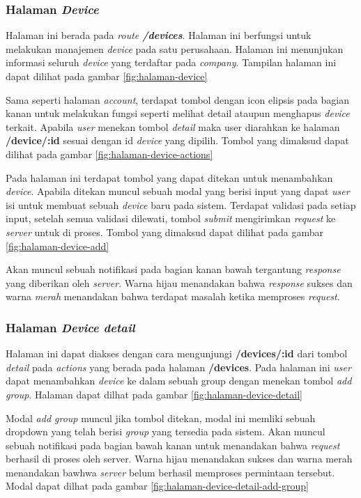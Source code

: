 \subsubsection{Halaman \textit{Device}}
Halaman ini berada pada \textit{route \textbf{/devices}}. Halaman ini berfungsi untuk melakukan manajemen \textit{device} pada satu perusahaan. Halaman ini menunjukan informasi seluruh \textit{device} yang terdaftar pada \textit{company}. Tampilan halaman ini dapat dilihat pada gambar \ref{fig:halaman-device}

Sama seperti halaman \textit{account}, terdapat tombol dengan icon elipsis pada bagian kanan untuk melakukan fungsi seperti melihat detail ataupun menghapus \textit{device} terkait. Apabila \textit{user} menekan tombol \textit{detail} maka user diarahkan ke halaman \textbf{/device/:id} sesuai dengan id \textit{device} yang dipilih. Tombol yang dimaksud dapat dilihat pada gambar \ref{fig:halaman-device-actions}

Pada halaman ini terdapat tombol yang dapat ditekan untuk menambahkan \textit{device}. Apabila ditekan muncul sebuah modal yang berisi input yang dapat \textit{user} isi untuk membuat sebuah \textit{device} baru pada sistem. Terdapat validasi pada setiap input, setelah semua validasi dilewati, tombol \textit{submit} mengirimkan \textit{request} ke \textit{server} untuk di proses. Tombol yang dimaksud dapat dilihat pada gambar \ref{fig:halaman-device-add}

Akan muncul sebuah notifikasi pada bagian kanan bawah tergantung \textit{response} yang diberikan oleh \textit{server}. Warna hijau menandakan bahwa \textit{response} sukses dan warna \textit{merah} menandakan bahwa terdapat masalah ketika memproses \textit{request}.

\subsubsection{Halaman \textit{Device detail}}
Halaman ini dapat diakses dengan cara mengunjungi \textbf{/devices/:id} dari tombol \textit{detail} pada \textit{actions} yang berada pada halaman \textbf{/devices}. Pada halaman ini \textit{user} dapat menambahkan \textit{device} ke dalam sebuah group dengan menekan tombol \textit{add group}. Halaman dapat dilhat pada gambar \ref{fig:halaman-device-detail}

Modal \textit{add group} muncul jika tombol ditekan, modal ini memliki sebuah dropdown yang telah berisi \textit{group} yang tersedia pada sistem. Akan muncul sebuah notifikasi pada bagian bawah kanan untuk menandakan bahwa \textit{request} berhasil di proses oleh server. Warna hijau menandakan sukses dan warna merah menandakan bawhwa \textit{server} belum berhasil memproses permintaan tersebut. Modal dapat dilhat pada gambar \ref{fig:halaman-device-detail-add-group}

